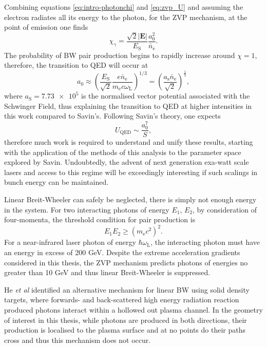 Combining equations \ref{eq:intro-photonchi} and \ref{eq:zvp_U} and assuming the electron radiates all its energy to the photon, for the ZVP mechanism, at the point of emission one finds
\begin{equation}
	\chi_\gamma =\frac{ \sqrt{2} |\mathbf{E}|}{E_\mathrm{S}}\frac{a^2_0}{\bar{n}_\mathrm{e}}.
\end{equation}
The probability of \ac{BW} pair production begins to rapidly increase around $\chi =1$, therefore, the transition to QED will occur at
\begin{equation}
	a_0 \approx \left(\frac{ E_\mathrm{S}}{\sqrt{2}}\frac{e\bar{n}_\mathrm{e}}{m_\mathrm{e}c\omega_\mathrm{L}}\right)^{1/3} = \left(\frac{a_\mathrm{s}\bar{n}_\mathrm{e}}{\sqrt{2}}\right)^{\frac{1}{3}},
\end{equation}
where $a_\mathrm{S} = \num{7.73e5}$ is the normalised vector potential associated with the Schwinger Field, thus explaining the transition to QED at higher intensities in this work compared to Savin's. Following Savin's theory, one expects
\begin{equation}
	U_\mathrm{QED} \sim \frac{a^7_0}{S},
\end{equation}
therefore much work is required to understand and unify these results, starting with the application of the methods of this analysis to the parameter space explored by Savin. Undoubtedly, the advent of next generation exa-watt scale lasers and access to this regime will be exceedingly interesting if such scalings in bunch energy can be maintained.

Linear Breit-Wheeler can safely be neglected, there is simply not enough energy in the system. For two interacting photons of energy $E_1$, $E_2$, by consideration of four-momenta, the threshold condition for pair production is 
\begin{equation}
	E_1E_2 \ge (m_\mathrm{e}c^2)^2.
\end{equation}
For a near-infrared laser photon of energy $\hbar \omega_\mathrm{L}$, the interacting photon must have an energy in excess of 200 GeV. Despite the extreme acceleration gradients considered in this thesis, the ZVP mechanism predicts photons of energies no greater than 10 GeV and thus linear Breit-Wheeler is suppressed.

He \textit{et al} \cite{heSinglelaserSchemeObservation2021} identified an alternative mechanism for linear \ac{BW} using solid density targets, where forwards- and back-scattered high energy radiation reaction produced photons interact within a hollowed out plasma channel. In the geometry of interest in this thesis, while photons are produced in both directions, their production is localised to the plasma surface and at no points do their paths cross and thus this mechanism does not occur.


